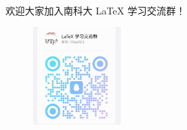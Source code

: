 \documentclass{libs/SUSTech_format}
\begin{document}





% 
% 
% 



{
	\begin{frame}{}
		\centering
		{\huge{\textbf{}}\\}
		\vspace{0.5cm}
		欢迎大家加入南科大 \LaTeX{} 学习交流群！
		\begin{figure}
			\includegraphics[width=0.3\textwidth]{latex_qq_group.jpg}
		\end{figure}
	\end{frame}
}
\end{document}
